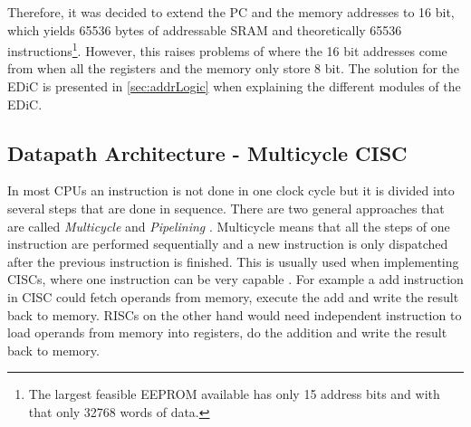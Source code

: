 Therefore, it was decided to extend the \gls{PC} and the memory addresses to 16 bit, which yields 65536 bytes of addressable \gls{SRAM} and theoretically 65536 instructions\footnote{The largest feasible \gls{EEPROM} available has only 15 address bits and with that only 32768 words of data.}.
However, this raises problems of where the 16 bit addresses come from when all the registers and the memory only store 8 bit.
The solution for the \gls{EDiC} is presented in \cref{sec:addrLogic} when explaining the different modules of the \gls{EDiC}.
\subsection{Datapath Architecture - Multicycle CISC}
In most \glspl{CPU} an instruction is not done in one clock cycle but it is divided into several steps that are done in sequence.
There are two general approaches that are called \emph{Multicycle} and \emph{Pipelining} \cite{PattersonDavid2016RuRD}.
Multicycle means that all the steps of one instruction are performed sequentially and a new instruction is only dispatched after the previous instruction is finished.
This is usually used when implementing \glspl{CISC}, where one instruction can be very capable \cite{chen_novick_shimano_2000}.
For example a add instruction in \gls{CISC} could fetch operands from memory, execute the add and write the result back to memory.
\glspl{RISC} on the other hand would need independent instruction to load operands from memory into registers, do the addition and write the result back to memory.

